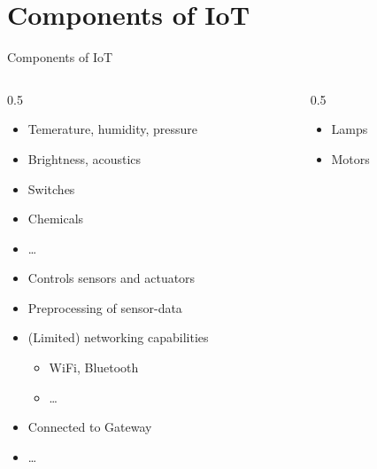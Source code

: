 ﻿

\nopartpage
\part{Components of IoT}
\withpartpage

\begin{frame}{Components of IoT}
  \begin{columns}[onlytextwidth]
    \begin{column}[T]{0.5\textwidth}
      \begin{description}[Microcontroller]
        \item[Sensors]
        \begin{itemize}
          \item Temerature, humidity, pressure
          \item Brightness, acoustics
          \item Switches
          \item Chemicals
          \item \ldots
        \end{itemize}
        \item[Microcontroller]
        \begin{itemize}
          \item Controls sensors and actuators
          \item Preprocessing of sensor-data
          \item (Limited) networking capabilities
          \begin{itemize}
            \item WiFi, Bluetooth
            \item \ldots
          \end{itemize}
          \item Connected to Gateway
          \item \ldots
        \end{itemize}
      \end{description}
    \end{column}
    \begin{column}[T]{0.5\textwidth}
      \begin{description}[Actuators]
        \item[Actuators]
        \begin{itemize}
          \item Lamps
          \item Motors

\end{itemize}
\end{description}
\end{column}
\end{columns}
\end{frame}
